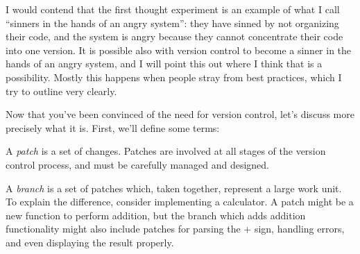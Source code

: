 \par{
I would contend that the first thought experiment is an example of what I call
``sinners in the hands of an angry system'': they have sinned by not
organizing their code, and the system is angry because they cannot
concentrate their code into one version. It is possible also with version
control to become a sinner in the hands of an angry system, and I will point
this out where I think that is a possibility. Mostly this happens when people
stray from best practices, which I try to outline very clearly.
}

\par{
Now that you've been convinced of the need for version control, let's discuss
more precisely what it is. First, we'll define some terms:
}

\par{
A \emph{patch} is a set of changes. Patches are involved at all stages of the
version control process, and must be carefully managed and designed. 
}
\par{
A \emph{branch} is a set of patches which, taken together, represent a large
work unit. To explain the difference, consider implementing a calculator. A
patch might be a new function to perform addition, but the branch which adds
addition functionality might also include patches for parsing the + sign,
handling errors, and even displaying the result properly. 
}

